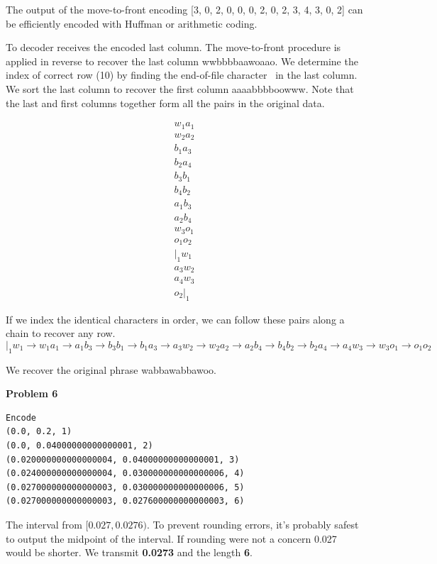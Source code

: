 \documentclass[11pt]{article}
\begin{document}
The output of the move-to-front encoding [3, 0, 2, 0, 0, 0, 2, 0, 2, 3, 4, 3, 0, 2] can be efficiently encoded with Huffman or arithmetic coding.

\medskip

To decoder receives the encoded last column.  The move-to-front procedure is applied in reverse to recover the last column wwbbbbaawo\textpipe aao.  We determine the index of correct row (10) by finding the end-of-file character \textpipe~in the last column.  We sort the last column to recover the first column aaaabbbboowww\textpipe.  Note that the last and first columns together form all the pairs in the original data.

\begin{align*}
w_1a_1\\
w_2a_2\\
b_1a_3\\
b_2a_4\\
b_3b_1\\
b_4b_2\\
a_1b_3\\
a_2b_4\\
w_3o_1\\
o_1o_2\\
|_1w_1\\
a_3w_2\\
a_4w_3\\
o_2|_1
\end{align*}

If we index the identical characters in order, we can follow these pairs along a chain to recover any row.
$$|_1w_1 \rightarrow w_1a_1 \rightarrow a_1b_3 \rightarrow b_3b_1 \rightarrow b_1a_3 \rightarrow a_3w_2 \rightarrow w_2a_2 \rightarrow a_2b_4 \rightarrow b_4b_2 \rightarrow b_2a_4 \rightarrow a_4w_3 \rightarrow w_3o_1 \rightarrow o_1o_2$$

We recover the original phrase wabbawabbawoo.

\pagebreak

\noindent \textbf{Problem 6}

\begin{verbatim}
Encode
(0.0, 0.2, 1)
(0.0, 0.04000000000000001, 2)
(0.020000000000000004, 0.04000000000000001, 3)
(0.024000000000000004, 0.030000000000000006, 4)
(0.027000000000000003, 0.030000000000000006, 5)
(0.027000000000000003, 0.027600000000000003, 6)
\end{verbatim}

The interval from $[0.027, 0.0276)$. To prevent rounding errors, it's probably safest to output the midpoint of the interval.  If rounding were not a concern 0.027 would be shorter.
We transmit \textbf{0.0273} and the length \textbf{6}.
\end{document}
